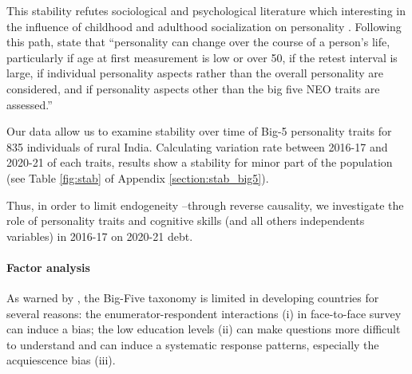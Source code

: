 \documentclass[a4paper, 11pt, onecolumn]{article}
\begin{document}
This stability refutes sociological and psychological literature which interesting in the influence of childhood and adulthood socialization on personality \citep{Mortimer1978, Moen1995}.
Following this path, \cite{Ardelt2000} state that ``personality can change over the course of a person's life, particularly if age at first measurement is low or over 50, if the retest interval is large, if individual personality aspects rather than the overall personality are considered, and if personality aspects other than the big five NEO traits are assessed.''


Our data allow us to examine stability over time of Big-5 personality traits for 835 individuals of rural India.
Calculating variation rate between 2016-17 and 2020-21 of each traits, results show a stability for minor part of the population (see Table \ref{fig:stab} of Appendix \ref{section:stab_big5}).

Thus, in order to limit endogeneity --through reverse causality, we investigate the role of personality traits and cognitive skills (and all others independents variables) in 2016-17 on 2020-21 debt.



\paragraph{Factor analysis}
As warned by \cite{Laajaj2019}, the Big-Five taxonomy is limited in developing countries for several reasons: the enumerator-respondent interactions (i) in face-to-face survey can induce a bias; the low education levels (ii) can make questions more difficult to understand and can induce a systematic response patterns, especially the acquiescence bias (iii).
\end{document}
